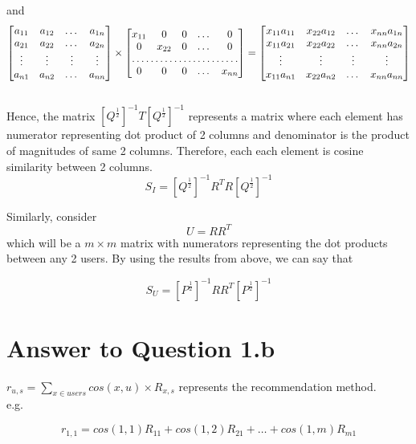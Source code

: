\documentclass[11pt]{article}
\begin{document}
{and
\[
\begin{bmatrix}
	a_{11} & a_{12} & \dots  & a_{1n} \\
    a_{21} & a_{22} & \dots  & a_{2n} \\
    \vdots & \vdots & \vdots & \vdots \\
    a_{n1} & a_{n2} & \dots  & a_{nn}
\end{bmatrix} \times
\begin{bmatrix}
    x_{11}   & 0 & 0 & \dots &0 \\
    0   & x_{22} & 0 & \dots & 0 \\
    \hdotsfor{5} \\
    0  & 0 & 0 & \dots & x_{nn}
\end{bmatrix}
=
\begin{bmatrix}
	x_{11}a_{11} & x_{22}a_{12} &  \dots  & x_{nn}a_{1n} \\
    x_{11}a_{21} & x_{22}a_{22} & \dots  & x_{nn}a_{2n} \\
    \vdots & \vdots & \vdots & \vdots \\
    x_{11}a_{n1} & x_{22}a_{n2} & \dots  & x_{nn}a_{nn}
\end{bmatrix}
\] \\

Hence, the matrix $[Q^{\frac{1}{2}}]^{-1} T [Q^{\frac{1}{2}}]^{-1}$ represents a matrix where each element has numerator representing dot product of 2 columns and denominator is the product of magnitudes of same 2 columns. Therefore, each each element is cosine similarity between 2 columns. \\

$$S_I = [Q^{\frac{1}{2}}]^{-1} R^TR [Q^{\frac{1}{2}}]^{-1}$$

Similarly, consider $$U = RR^T$$ which will be a $m \times m$ matrix with numerators representing the dot products between any 2 users. By using the results from above, we can say that

$$S_U = [P^{\frac{1}{2}}]^{-1} RR^T [P^{\frac{1}{2}}]^{-1}$$

\pagebreak[4]
\section*{Answer to Question 1.b}

$r_{u,s} = \sum_{x \in users} cos(x, u) \times R_{x,s}$ represents the recommendation method.\\
e.g.

$$r_{1,1} = cos(1,1)R_{11} + cos(1,2)R_{21} + \hdots + cos(1,m)R_{m1}$$

}
\end{document}
